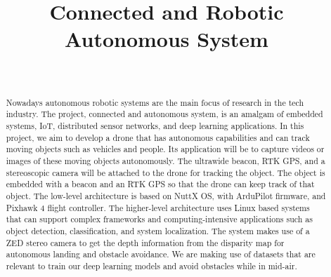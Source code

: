 \documentclass{IEEEtran}
\begin{document}
%
\title{Connected and Robotic Autonomous System}


\author{ \\
 }
 
\maketitle

\begin{abstract}
Nowadays autonomous robotic systems are the main focus of research in the tech industry. The project, connected and autonomous system, is an amalgam of embedded systems, IoT, distributed sensor networks, and deep learning applications. In this project, we aim to develop a drone that has autonomous capabilities and can track moving objects such as vehicles and people. Its application will be to capture videos or images of these moving objects autonomously. The ultrawide beacon, RTK GPS, and a stereoscopic camera will be attached to the drone for tracking the object. The object is embedded with a beacon and an RTK GPS so that the drone can keep track of that object. 
\newline The low-level architecture is based on NuttX OS, with ArduPilot firmware, and Pixhawk 4 flight controller. The higher-level architecture uses Linux based systems that can support complex frameworks and computing-intensive applications such as object detection, classification, and system localization. The system makes use of a ZED stereo camera to get the depth information from the disparity map for autonomous landing and obstacle avoidance. We are making use of datasets that are relevant to train our deep learning models and avoid obstacles while in mid-air.

\end{abstract}
\end{document}
